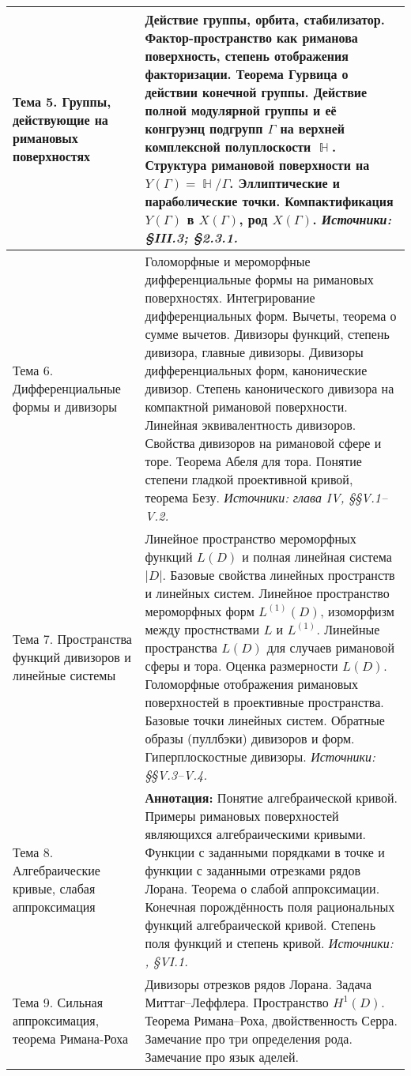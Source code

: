 \documentclass[a4paper, 12pt]{article}
\DeclareMathOperator{\HH}{\mathbb{H}}
\begin{document}
\begin{longtable}{ | >{\raggedright}p{5cm} | p{10cm} | }
    Тема 5. Группы, действующие на римановых поверхностях & Действие группы, орбита, стабилизатор. Фактор-пространство как риманова поверхность, степень отображения факторизации. Теорема Гурвица о действии конечной группы. Действие полной модулярной группы и её конгруэнц подгрупп $\Gamma$ на верхней комплексной полуплоскости $\HH$. Структура римановой поверхности на $Y(\Gamma) = \HH/\Gamma$. Эллиптические и параболические точки. Компактификация $Y(\Gamma)$ в $X(\Gamma)$, род $X(\Gamma)$.
    \textit{Источники: \cite{Mir} \S III.3; \cite{DS} \S 2.3.1.}\\ \hline
    Тема 6. Дифференциальные формы и дивизоры & Голоморфные и мероморфные дифференциальные формы на римановых поверхностях. Интегрирование дифференциальных форм. Вычеты, теорема о сумме вычетов. Дивизоры функций, степень дивизора, главные дивизоры. Дивизоры дифференциальных форм, канонические дивизор. Степень канонического дивизора на компактной римановой поверхности. Линейная эквивалентность дивизоров. Свойства дивизоров на римановой сфере и торе. Теорема Абеля для тора. Понятие степени гладкой проективной кривой, теорема Безу.
    \textit{Источники: \cite{Mir} глава IV, \S\S V.1--V.2.}\\ \hline
    Тема 7. Пространства функций дивизоров и линейные системы & Линейное пространство мероморфных функций $L(D)$ и полная линейная система $|D|$. Базовые свойства линейных пространств и линейных систем. Линейное пространство мероморфных форм $L^{(1)}(D)$, изоморфизм между простнствами $L$ и $L^{(1)}$. Линейные пространства $L(D)$ для случаев римановой сферы и тора. Оценка размерности $L(D)$. Голоморфные отображения римановых поверхностей в проективные пространства. Базовые точки линейных систем. Обратные образы (пуллбэки) дивизоров и форм. Гиперплоскостные дивизоры.
    \textit{Источники: \cite{Mir} \S\S V.3--V.4.}\\ \hline
    Тема 8. Алгебраические кривые, слабая аппроксимация & {\bf Аннотация:} Понятие алгебраической кривой. Примеры римановых поверхностей являющихся алгебраическими кривыми. Функции с заданными порядками в точке и функции с заданными отрезками рядов Лорана. Теорема о слабой аппроксимации. Конечная порождённость поля рациональных функций алгебраической кривой. Степень поля функций и степень кривой.
    \textit{Источники: \cite{Mir}, \S VI.1.}\\ \hline
    Тема 9. Сильная аппроксимация, теорема Римана-Роха & Дивизоры отрезков рядов Лорана. Задача Миттаг--Леффлера. Пространство $H^1(D)$. Теорема Римана--Роха, двойственность Серра. Замечание про три определения рода. Замечание про язык аделей.

\end{longtable}
\end{document}
